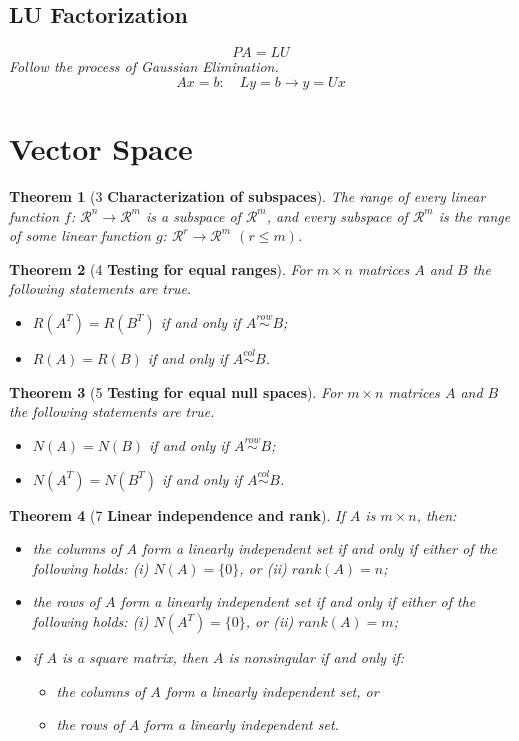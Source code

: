 \documentclass[10.5pt]{article}
\newtheorem{theo}{Theorem}
\begin{document}
\subsection{LU Factorization}
$$PA=LU$$
\textit{Follow the process of Gaussian Elimination.}
$$Ax=b: \quad Ly=b \rightarrow y=Ux$$
\pagebreak
\section{Vector Space}
\begin{theo}[3 \textbf{Characterization of subspaces}]
The range of every linear function $f$: $\mathcal{R}^n \to \mathcal{R}^m$ is a subspace of $\mathcal{R}^m$, and every subspace of $\mathcal{R}^m$ is the range of some linear function $g$: $\mathcal{R}^r \to \mathcal{R}^m$ $(r\leq m)$.
\end{theo}
\begin{theo}[4 \textbf{Testing for equal ranges}]
For $m \times n$ matrices $A$ and $B$ the following statements are true.
\begin{itemize}
\item $R(A^T) = R(B^T)$ if and only if $A \overset{row}{\sim} B$;
\item $R(A) = R(B)$ if and only if $A \overset{col}{\sim} B$.
\end{itemize}
\end{theo}
\begin{theo}[5 \textbf{Testing for equal null spaces}]
For $m \times n$ matrices $A$ and $B$ the following statements are true.
\begin{itemize}
\item $N(A) = N(B)$ if and only if $A \overset{row}{\sim} B$;
\item $N(A^T) = N(B^T)$ if and only if $A \overset{col}{\sim} B$.
\end{itemize}
\end{theo}
\begin{theo}[7 \textbf{Linear independence and rank}]
If $A$ is $m \times n$, then:
\begin{itemize}
\item the columns of $A$ form a linearly independent set if and only if either of the following holds: (i) $N(A) = \{0\}$, or (ii) $rank(A) = n$;
\item the rows of $A$ form a linearly independent set if and only if either of the following holds: (i) $N(A^T) = \{0\}$, or (ii) $rank(A) = m$;
\item if $A$ is a square matrix, then $A$ is nonsingular if and only if:
\begin{itemize}
\item the columns of $A$ form a linearly independent set, or
\item the rows of $A$ form a linearly independent set.
\end{itemize}
\end{itemize}
\end{theo}
\end{document}
